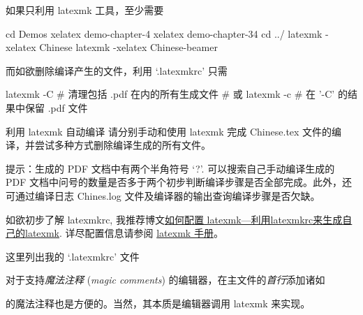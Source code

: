 如果只利用 latexmk 工具，至少需要
\begin{bashlst}[numbers=left]
cd Demos
xelatex demo-chapter-4
xelatex demo-chapter-34
cd ../
latexmk -xelatex Chinese
latexmk -xelatex Chinese-beamer
\end{bashlst}
而如欲删除编译产生的文件，利用 `.latexmkrc' 只需
\begin{bashlst}
latexmk -C  # 清理包括 .pdf 在内的所有生成文件
# 或
latexmk -c  # 在 '-C' 的结果中保留 .pdf 文件
\end{bashlst}

\begin{Ex}{利用 latexmk 自动编译}
请分别手动和使用 latexmk 完成 Chinese.tex 文件的编译，并尝试多种方式删除编译生成的所有文件。\\ \myhrule

提示：生成的 PDF 文档中有两个半角符号 `?'. 可以搜索自己手动编译生成的 PDF 文档中问号的数量是否多于两个初步判断编译步骤是否全部完成。此外，还可通过编译日志 Chines.log 文件及编译器的输出查询编译步骤是否欠缺。
\end{Ex}

如欲初步了解 latexmkrc, 我推荐博文\href{https://blog.prosight.me/2019/05/23/latexmk/}{如何配置 latexmk---利用latexmkrc来生成自己的latexmk}. 详尽配置信息请参阅 \href{http://personal.psu.edu/jcc8//software/latexmk-jcc/}{latexmk 手册}。

这里列出我的 `.latexmkrc' 文件

对于支持\emph{魔法注释} (\emph{magic comments}) 的编辑器，在主文件的\emph{首行}添加诸如
\begin{texlst}[numbers=left]
\end{texlst}
的魔法注释也是方便的。当然，其本质是编辑器调用 latexmk 来实现。
